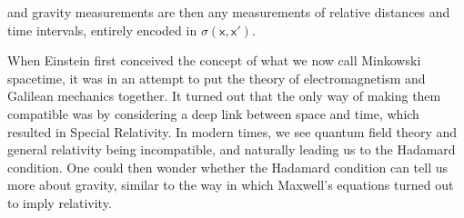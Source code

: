 \documentclass[letterpaper,12pt,titlepage,oneside,final]{book}
\newcommand{\mf}{\mathsf}%
\begin{document}
\noindent and gravity measurements are then any measurements of relative distances and time intervals, entirely encoded in $\sigma(\mf x, \mf x')$.


When Einstein first conceived the concept of what we now call Minkowski spacetime, it was in an attempt to put the theory of electromagnetism and Galilean mechanics together. It turned out that the only way of making them compatible was by considering a deep link between space and time, which resulted in Special Relativity. In modern times, we see quantum field theory and general relativity being incompatible, and naturally leading us to the Hadamard condition. One could then wonder whether the Hadamard condition can tell us more about gravity, similar to the way in which Maxwell's equations turned out to imply relativity.
\end{document}
